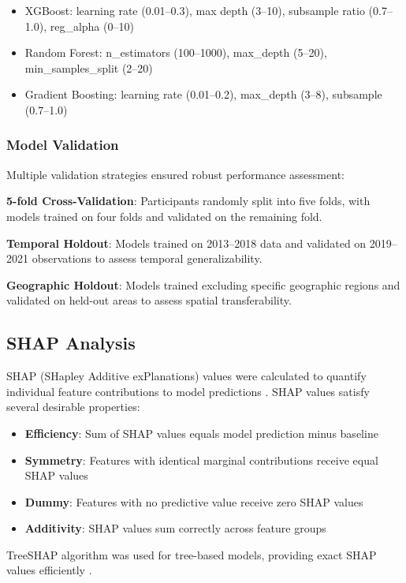 \documentclass[journal,article,submit,pdftex,moreauthors]{Definitions/mdpi}
\begin{document}
\begin{itemize}
\item XGBoost: learning rate (0.01--0.3), max depth (3--10), subsample ratio (0.7--1.0), reg\_alpha (0--10)
\item Random Forest: n\_estimators (100--1000), max\_depth (5--20), min\_samples\_split (2--20)
\item Gradient Boosting: learning rate (0.01--0.2), max\_depth (3--8), subsample (0.7--1.0)
\end{itemize}

\subsubsection{Model Validation}

Multiple validation strategies ensured robust performance assessment:

\textbf{5-fold Cross-Validation}: Participants randomly split into five folds, with models trained on four folds and validated on the remaining fold.

\textbf{Temporal Holdout}: Models trained on 2013--2018 data and validated on 2019--2021 observations to assess temporal generalizability.

\textbf{Geographic Holdout}: Models trained excluding specific geographic regions and validated on held-out areas to assess spatial transferability.

\subsection{SHAP Analysis}

SHAP (SHapley Additive exPlanations) values were calculated to quantify individual feature contributions to model predictions \cite{lundberg2017unified}. SHAP values satisfy several desirable properties:

\begin{itemize}
\item \textbf{Efficiency}: Sum of SHAP values equals model prediction minus baseline
\item \textbf{Symmetry}: Features with identical marginal contributions receive equal SHAP values  
\item \textbf{Dummy}: Features with no predictive value receive zero SHAP values
\item \textbf{Additivity}: SHAP values sum correctly across feature groups
\end{itemize}

TreeSHAP algorithm was used for tree-based models, providing exact SHAP values efficiently \cite{lundberg2020local}.
\end{document}
